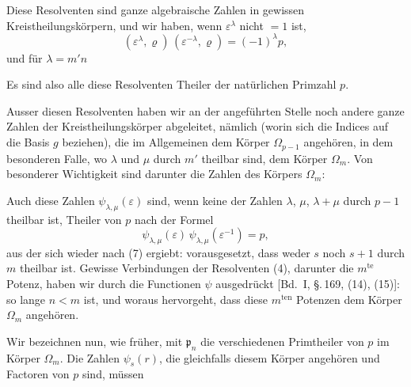 Diese Resolventen sind ganze algebraische Zahlen in gewissen
Kreistheilungskörpern, und wir haben, wenn $\varepsilon^\lambda$ nicht $=1$ ist,
\[
(\varepsilon^\lambda,\varrho)\,(\varepsilon^{-\lambda},\varrho) = (-1)^\lambda p,
\]
und für $\lambda = m'n$

Es sind also alle diese Resolventen Theiler der natürlichen
Primzahl $p$.

Ausser diesen Resolventen haben wir an der angeführten
Stelle noch andere ganze Zahlen der Kreistheilungskörper abgeleitet, nämlich
(worin sich die Indices auf die Basis $g$ beziehen), die im Allgemeinen dem Körper $\Omega_{p-1}$ angehören, in dem besonderen Falle, wo $\lambda$ und $\mu$ durch $m'$ theilbar sind, dem Körper $\Omega_m$. Von besonderer Wichtigkeit sind darunter die Zahlen des Körpers $\Omega_m$:

Auch diese Zahlen $\psi_{\lambda,\mu}(\varepsilon)$ sind, wenn keine der Zahlen $\lambda$, $\mu$, $\lambda+\mu$ durch $p-1$ theilbar ist, Theiler von $p$ nach der Formel
\[
\psi_{\lambda,\mu}(\varepsilon)\,\psi_{\lambda,\mu}(\varepsilon^{-1}) = p,
\]
aus der sich wieder nach (7) ergiebt:
vorausgesetzt, dass weder $s$ noch $s+1$ durch $m$ theilbar ist. Gewisse Verbindungen der Resolventen (4), darunter die $m^{\mathrm{te}}$ Potenz, haben wir durch die Functionen $\psi$ ausgedrückt [Bd.\ I, \S.\,169, (14), (15)]:
so lange $n<m$ ist, und
woraus hervorgeht, dass diese $m^{\mathrm{ten}}$ Potenzen dem Körper $\Omega_m$ angehören.

Wir bezeichnen nun, wie früher, mit $\mathfrak{p}_n$ die verschiedenen Primtheiler von $p$ im Körper $\Omega_m$. Die Zahlen $\psi_s(r)$, die gleichfalls diesem Körper angehören und Factoren von $p$ sind, müssen
